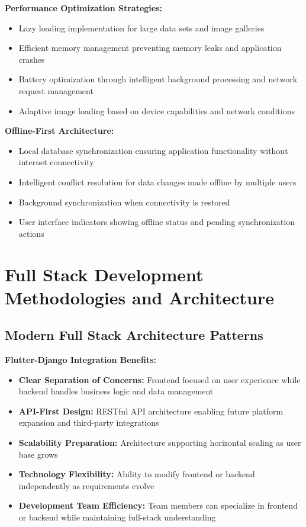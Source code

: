 \textbf{Performance Optimization Strategies:}
\begin{itemize}
    \item Lazy loading implementation for large data sets and image galleries
    \item Efficient memory management preventing memory leaks and application crashes
    \item Battery optimization through intelligent background processing and network request management
    \item Adaptive image loading based on device capabilities and network conditions
\end{itemize}

\textbf{Offline-First Architecture:}
\begin{itemize}
    \item Local database synchronization ensuring application functionality without internet connectivity
    \item Intelligent conflict resolution for data changes made offline by multiple users
    \item Background synchronization when connectivity is restored
    \item User interface indicators showing offline status and pending synchronization actions
\end{itemize}

\section{Full Stack Development Methodologies and Architecture}

\subsection{Modern Full Stack Architecture Patterns}

\textbf{Flutter-Django Integration Benefits:}
\begin{itemize}
    \item \textbf{Clear Separation of Concerns:} Frontend focused on user experience while backend handles business logic and data management
    \item \textbf{API-First Design:} RESTful API architecture enabling future platform expansion and third-party integrations
    \item \textbf{Scalability Preparation:} Architecture supporting horizontal scaling as user base grows
    \item \textbf{Technology Flexibility:} Ability to modify frontend or backend independently as requirements evolve
    \item \textbf{Development Team Efficiency:} Team members can specialize in frontend or backend while maintaining full-stack understanding
\end{itemize}

